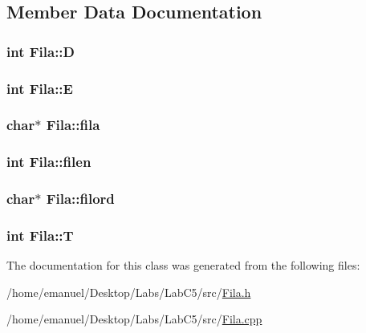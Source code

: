 \subsection{Member Data Documentation}
\hypertarget{class_fila_aee0859c7d7a52dc7436f7ff899ee0e58}{
\subsubsection[{D}]{\setlength{\rightskip}{0pt plus 5cm}int Fila\+::\+D}}\label{class_fila_aee0859c7d7a52dc7436f7ff899ee0e58}
\hypertarget{class_fila_a8c0087eed7062cb6646d380727e1f8ad}{
\subsubsection[{E}]{\setlength{\rightskip}{0pt plus 5cm}int Fila\+::\+E}}\label{class_fila_a8c0087eed7062cb6646d380727e1f8ad}
\hypertarget{class_fila_a36a3d7e1492ea5bc367a23f6af9d1ce7}{
\subsubsection[{fila}]{\setlength{\rightskip}{0pt plus 5cm}char$\ast$ Fila\+::fila}}\label{class_fila_a36a3d7e1492ea5bc367a23f6af9d1ce7}
\hypertarget{class_fila_a8da3061b2ff7c7a9c93571383c345294}{
\subsubsection[{filen}]{\setlength{\rightskip}{0pt plus 5cm}int Fila\+::filen}}\label{class_fila_a8da3061b2ff7c7a9c93571383c345294}
\hypertarget{class_fila_ae89d6f3b865cf2e4fb66cb793df4b9d6}{
\subsubsection[{filord}]{\setlength{\rightskip}{0pt plus 5cm}char$\ast$ Fila\+::filord}}\label{class_fila_ae89d6f3b865cf2e4fb66cb793df4b9d6}
\hypertarget{class_fila_aa22383da45e0e0292cc7d137af754812}{
\subsubsection[{T}]{\setlength{\rightskip}{0pt plus 5cm}int Fila\+::\+T}}\label{class_fila_aa22383da45e0e0292cc7d137af754812}


The documentation for this class was generated from the following files\+:\begin{DoxyCompactItemize}
\item 
/home/emanuel/\+Desktop/\+Labs/\+Lab\+C5/src/\hyperlink{_fila_8h}{Fila.\+h}\item 
/home/emanuel/\+Desktop/\+Labs/\+Lab\+C5/src/\hyperlink{_fila_8cpp}{Fila.\+cpp}\end{DoxyCompactItemize}
